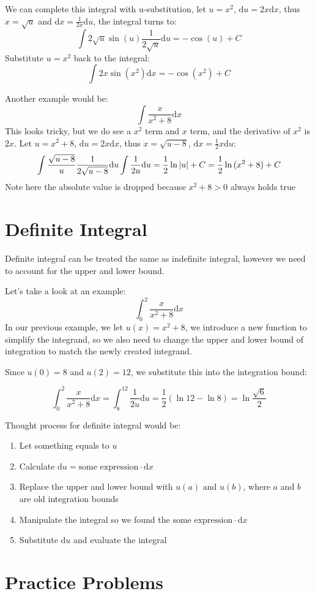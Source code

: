 \documentclass{article}
\numberwithin{equation}{section}
\begin{document}
We can complete this integral with u-substitution, let $u=x^2$, $\mathrm{d}u = 2x \mathrm{d}x$, thus $x = \sqrt{u}$ and $\mathrm{d}x = \frac{1}{2x}\mathrm{d}u$, the integral turns to:
\[
\int 2\sqrt{u} \sin(u) \frac{1}{2\sqrt{u}}\mathrm{d}u = -\cos(u) + C
\]
Substitute $u = x^2$ back to the integral:
\[
\int 2x \sin(x^2)\mathrm{d}x = -\cos(x^2) + C
\]

Another example would be:
\[
\int \frac{x}{x^2+8}\mathrm{d}x
\]
This looks tricky, but we do see a $x^2$ term and $x$ term, and the derivative of $x^2$ is $2x$.
Let $u = x^2+8$, $\mathrm{d}u = 2x \mathrm{d}x$, thus $\displaystyle x = \sqrt{u - 8}$, $\mathrm{d}x = \frac{1}{2}x \mathrm{d}u$:
\[
\int \frac{\sqrt{u - 8}}{u} \frac{1}{2\sqrt{u - 8}}\mathrm{d}u\int \frac{1}{2u} \mathrm{d}u = \frac{1}{2} \ln{\abs{u}} + C = \frac{1}{2} \ln{(x^2+8)} + C
\]
Note here the absolute value is dropped because $x^2 + 8 >0$ always holds true

\section{Definite Integral}
Definite integral can be treated the same as indefinite integral, however we need to account for the upper and lower bound.

Let's take a look at an example:
\[
\int_{0}^{2} \frac{x}{x^2+8}\mathrm{d}x
\]
In our previous example, we let $u(x) = x^2+8$, we introduce a new function to simplify the integrand,
so we also need to change the upper and lower bound of integration to match the newly created integrand.

Since $u(0) = 8$ and $u(2) = 12$, we substitute this into the integration bound:

\[
\int_{0}^{2} \frac{x}{x^2+8}\mathrm{d}x = \int_{8}^{12} \frac{1}{2u}\mathrm{d}u = \frac{1}{2} (\ln{12}-\ln{8}) = \ln{\frac{\sqrt{6}}{2}}
\]

Thought process for definite integral would be:
\begin{enumerate}
    \item Let something equals to $u$
    \item Calculate $\mathrm{d}u = \text{some expression} \cdot \mathrm{d}x$
    \item Replace the upper and lower bound with $u(a)$ and $u(b)$, where $a$ and $b$ are old integration bounds
    \item Manipulate the integral so we found the $\text{some expression} \cdot \mathrm{d}x$
    \item Substitute $\mathrm{d}u$ and evaluate the integral
\end{enumerate}

\newpage
\section{Practice Problems}
\end{document}
